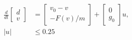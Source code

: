 \documentclass[preview]{standalone}
\begin{document}
\begin{align*}
\frac{d}{dt}\begin{bmatrix}d\\ v\end{bmatrix} &= \begin{bmatrix}v_0 - v\\ -F(v)/m\end{bmatrix} + \begin{bmatrix}0\\g_0\end{bmatrix}u, \\ |u| &\leq 0.25\\
\end{align*}
\end{document}
